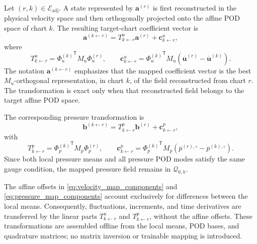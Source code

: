 Let $(r,k)\in\mathcal{E}_{\mathrm{adj}}$.  A state represented by
$\boldsymbol{a}^{(r)}$ is first reconstructed in the physical velocity space
and then orthogonally projected onto the affine POD space of chart $k$.  The
resulting target-chart coefficient vector is
\begin{equation}
  \boldsymbol{a}^{(k\leftarrow r)}
  =
  T^{u}_{k\leftarrow r}\boldsymbol{a}^{(r)}
  +\boldsymbol{c}^{u}_{k\leftarrow r},
  \label{eq:velocity_affine_map}
\end{equation}
where
\begin{equation}
  T^{u}_{k\leftarrow r}
  =
  {\Phi_u^{(k)}}^{\mathsf T}
  M_u
  \Phi_u^{(r)},
  \qquad
  \boldsymbol{c}^{u}_{k\leftarrow r}
  =
  {\Phi_u^{(k)}}^{\mathsf T}
  M_u
  \left(
    \overline{\boldsymbol{u}}^{(r)}
    -\overline{\boldsymbol{u}}^{(k)}
  \right).
  \label{eq:velocity_map_components}
\end{equation}
The notation $\boldsymbol{a}^{(k\leftarrow r)}$ emphasizes that the mapped
coefficient vector is the best $M_u$-orthogonal representation, in chart
$k$, of the field reconstructed from chart $r$.  The transformation is exact
only when that reconstructed field belongs to the target affine POD space.

The corresponding pressure transformation is
\begin{equation}
  \boldsymbol{b}^{(k\leftarrow r)}
  =
  T^{p}_{k\leftarrow r}\boldsymbol{b}^{(r)}
  +\boldsymbol{c}^{p}_{k\leftarrow r},
  \label{eq:pressure_affine_map}
\end{equation}
with
\begin{equation}
  T^{p}_{k\leftarrow r}
  =
  {\Phi_p^{(k)}}^{\mathsf T}
  M_p
  \Phi_p^{(r)},
  \qquad
  \boldsymbol{c}^{p}_{k\leftarrow r}
  =
  {\Phi_p^{(k)}}^{\mathsf T}
  M_p
  \left(
    \overline{p}^{(r),\circ}
    -\overline{p}^{(k),\circ}
  \right).
  \label{eq:pressure_map_components}
\end{equation}
Since both local pressure means and all pressure POD modes satisfy the same
gauge condition, the mapped pressure field remains in
$\mathcal{Q}_{0,h}$.

The affine offsets in
\eqref{eq:velocity_map_components} and
\eqref{eq:pressure_map_components} account exclusively for differences
between the local means.  Consequently, fluctuations, increments, and time
derivatives are transferred by the linear parts $T^u_{k\leftarrow r}$ and
$T^p_{k\leftarrow r}$, without the affine offsets.  These transformations
are assembled offline from the local means, POD bases, and quadrature
matrices; no matrix inversion or trainable mapping is introduced.

